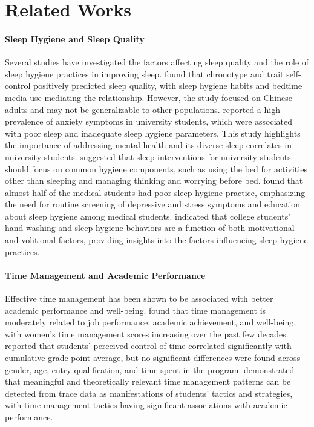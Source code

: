 \section{Related Works}

\paragraph{Sleep Hygiene and Sleep Quality}
Several studies have investigated the factors affecting sleep quality and the role of sleep hygiene practices in improving sleep. \citet{lin2022chronotype} found that chronotype and trait self-control positively predicted sleep quality, with sleep hygiene habits and bedtime media use mediating the relationship. However, the study focused on Chinese adults and may not be generalizable to other populations. \citet{manzar2021anxiety} reported a high prevalence of anxiety symptoms in university students, which were associated with poor sleep and inadequate sleep hygiene parameters. This study highlights the importance of addressing mental health and its diverse sleep correlates in university students. \citet{humphries2021dysfunctional} suggested that sleep interventions for university students should focus on common hygiene components, such as using the bed for activities other than sleeping and managing thinking and worrying before bed. \citet{molla2021magnitude} found that almost half of the medical students had poor sleep hygiene practice, emphasizing the need for routine screening of depressive and stress symptoms and education about sleep hygiene among medical students. \citet{zhang2020predicting} indicated that college students' hand washing and sleep hygiene behaviors are a function of both motivational and volitional factors, providing insights into the factors influencing sleep hygiene practices.

\paragraph{Time Management and Academic Performance}
Effective time management has been shown to be associated with better academic performance and well-being. \citet{aeon2021does} found that time management is moderately related to job performance, academic achievement, and well-being, with women's time management scores increasing over the past few decades. \citet{adams2019impact} reported that students' perceived control of time correlated significantly with cumulative grade point average, but no significant differences were found across gender, age, entry qualification, and time spent in the program. \citet{uzir2019analytics} demonstrated that meaningful and theoretically relevant time management patterns can be detected from trace data as manifestations of students' tactics and strategies, with time management tactics having significant associations with academic performance.

